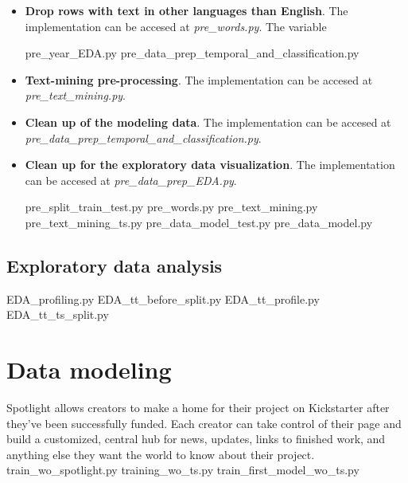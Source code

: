 \documentclass{article}
\begin{document}
{\begin{itemize}
\begin{itemize}
	The number of columns was reduced to 125.
	
	\item  Currency pruning.
	The implementation can be accesed at \emph{pre\_currency\_pruning.py }.
	
	Currency encodes 14 different levels. Plots and percentages of succesfull projects were performed for 'currency\_orig'. Currencies with more than 55\% of successful projects were retained (GBP, HKD, SGD, JPY) and compared to the retained countries. All currency levels were dropped because the selected currencies correspond to countries that already selected and the information was redundant.
	
	The number of columns was reduced to 112.
        
    \end{itemize}
    \item \textbf{Drop rows with text in other languages than English}.
    The implementation can be accesed at \emph{pre\_words.py}.
    The variable
    
pre\_year\_EDA.py
    pre\_data\_prep\_temporal\_and\_classification.py  
    
    \item \textbf{Text-mining pre-processing}.
    The implementation can be accesed at \emph{pre\_text\_mining.py}.
    \item \textbf{Clean up of the modeling data}.
    The implementation can be accesed at \emph{pre\_data\_prep\_temporal\_and\_classification.py}.
    \item \textbf{Clean up for the exploratory data visualization}.
    The implementation can be accesed at \emph{pre\_data\_prep\_EDA.py}.
     
  

    pre\_split\_train\_test.py                         
    pre\_words.py
    pre\_text\_mining.py
    pre\_text\_mining\_ts.py
    pre\_data\_model\_test.py    
    pre\_data\_model.py 
\end{itemize}

\subsection{Exploratory data analysis}
\label{subsec:EDA}
                   
EDA\_profiling.py                              
EDA\_tt\_before\_split.py                        
EDA\_tt\_profile.py                             
EDA\_tt\_ts\_split.py
\section{Data modeling}
\label{sec:model}
Spotlight allows creators to make a home for their project on Kickstarter after they’ve been successfully funded. Each creator can take control of their page and build a customized, central hub for news, updates, links to finished work, and anything else they want the world to know about their project.
train\_wo\_spotlight.py
training\_wo\_ts.py
train\_first\_model\_wo\_ts.py
}
\end{document}

